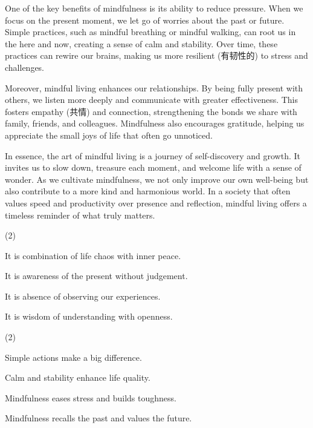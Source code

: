 \documentclass{英语试卷}
\begin{document}
\par One of the key benefits of mindfulness is its ability to reduce pressure. When we focus on the present moment, we let go of worries about the past or future. Simple practices, such as mindful breathing or mindful walking, can root us in the here and now, creating a sense of calm and stability. Over time, these practices can rewire our brains, making us more resilient (有韧性的) to stress and challenges.\par
\par Moreover, mindful living enhances our relationships. By being fully present with others, we listen more deeply and communicate with greater effectiveness. This fosters empathy (共情) and connection, strengthening the bonds we share with family, friends, and colleagues. Mindfulness also encourages gratitude, helping us appreciate the small joys of life that often go unnoticed.\par
\par In essence, the art of mindful living is a journey of self-discovery and growth. It invites us to slow down, treasure each moment, and welcome life with a sense of wonder. As we cultivate mindfulness, we not only improve our own well-being but also contribute to a more kind and harmonious world. In a society that often values speed and productivity over presence and reflection, mindful living offers a timeless reminder of what truly matters.\par
{}
\begin{choices}(2)
  \item It is combination of life chaos with inner peace.
  \item It is awareness of the present without judgement.
  \item It is absence of observing our experiences.
  \item It is wisdom of understanding with openness.
\end{choices}
\begin{choices}(2)
  \item Simple actions make a big difference.
  \item Calm and stability enhance life quality.
  \item Mindfulness eases stress and builds toughness.
  \item Mindfulness recalls the past and values the future.
\end{choices}
\end{document}
